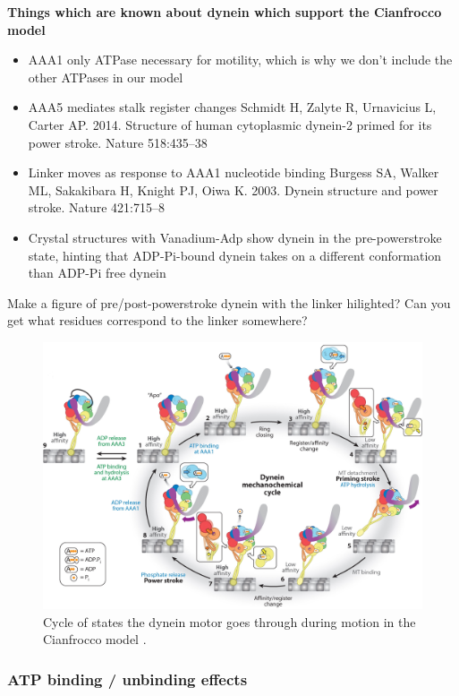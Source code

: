 \documentclass[10pt]{article} %
\begin{document}
\textbf{Things which are known about dynein which support the Cianfrocco model}
\begin{itemize}
\item AAA1 only ATPase necessary for motility, which is why we don't include the other ATPases in our model \cite{cianfroccoreview}
\item AAA5 mediates stalk register changes Schmidt H, Zalyte R, Urnavicius L, Carter AP. 2014. Structure of human cytoplasmic dynein-2 primed for
  its power stroke. Nature 518:435–38
\item Linker moves as response to AAA1 nucleotide binding Burgess SA, Walker ML, Sakakibara H, Knight PJ, Oiwa K. 2003. Dynein structure and power stroke. Nature
  421:715–8
\item Crystal structures with Vanadium-Adp show dynein in the pre-powerstroke state, hinting that ADP-Pi-bound dynein takes on a different conformation than ADP-Pi free dynein
\end{itemize}

Make a figure of pre/post-powerstroke dynein with the linker hilighted? Can you get what residues correspond to the linker somewhere?

\begin{figure}[h]
  \centering
  \includegraphics[width=.85\textwidth,keepaspectratio]{../../figures/mechanochemical-cycle.jpeg}
  \caption{Cycle of states the dynein motor goes through during motion in the Cianfrocco model \cite{cianfroccoreview}.}
  \label{mech-cycle}
\end{figure}

\subsubsection{ATP binding / unbinding effects}
\end{document}
